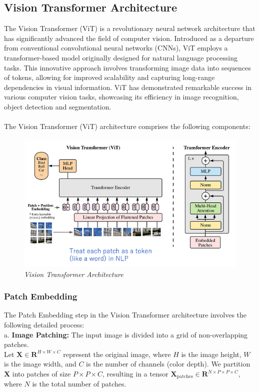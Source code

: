 \subsection{Vision Transformer Architecture}

The Vision Transformer (ViT) is a revolutionary neural network architecture that has significantly advanced the field of computer vision. Introduced as a departure from conventional convolutional neural networks (CNNs), ViT employs a transformer-based model originally designed for natural language processing tasks. This innovative approach involves transforming image data into sequences of tokens, allowing for improved scalability and capturing long-range dependencies in visual information. ViT has demonstrated remarkable success in various computer vision tasks, showcasing its efficiency in image recognition, object detection and segmentation.
\\\\
The Vision Transformer (ViT) architecture comprises the following components:

\begin{figure}[htbp]
    \centering
    \includegraphics[width=6in]{img/visiontransformer.png}
    \caption{\textit{Vision Transformer Architecture}}
\end{figure}

\item
\subsubsection{Patch Embedding}
The Patch Embedding step in the Vision Transformer architecture involves the following detailed process:
\\

\noindent a. \textbf{Image Patching:} The input image is divided into a grid of non-overlapping patches.\\
Let $\mathbf{X} \in \mathbf{R}^{H \times W \times C}$ represent the original image, where $H$ is the image height, $W$ is the image width, and $C$ is the number of channels (color depth). We partition $\mathbf{X}$ into patches of size $P \times P \times C$, resulting in a tensor $\mathbf{X}_\text{patches} \in \mathbf{R}^{N \times P \times P \times C}$, where $N$ is the total number of patches.
\\

